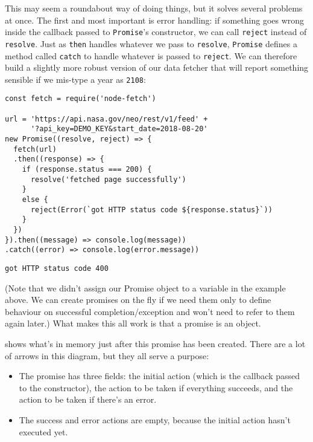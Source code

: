 This may seem a roundabout way of doing things,
but it solves several problems at once.
The first and most important is error handling:
if something goes wrong inside the callback passed to \texttt{Promise}'s constructor,
we can call \texttt{reject} instead of \texttt{resolve}.
Just as \texttt{then} handles whatever we pass to \texttt{resolve},
\texttt{Promise} defines a method called \texttt{catch} to handle whatever is passed to \texttt{reject}.
We can therefore build a slightly more robust version of our data fetcher
that will report something sensible if we mis-type a year as \texttt{2108}:

\begin{verbatim}
const fetch = require('node-fetch')

url = 'https://api.nasa.gov/neo/rest/v1/feed' +
      '?api_key=DEMO_KEY&start_date=2018-08-20'
new Promise((resolve, reject) => {
  fetch(url)
  .then((response) => {
    if (response.status === 200) {
      resolve('fetched page successfully')
    }
    else {
      reject(Error(`got HTTP status code ${response.status}`))
    }
  })
}).then((message) => console.log(message))
.catch((error) => console.log(error.message))
\end{verbatim}

\begin{verbatim}
got HTTP status code 400
\end{verbatim}

(Note that we didn't assign our Promise object to a variable in the example above.
We can create promises on the fly if we need them only to define behaviour on
successful completion/exception and won't need to refer to them again later.)
What makes this all work is that a promise is an object.


 shows what's in memory just after this promise has been created.
There are a lot of arrows in this diagram,
but they all serve a purpose:

\begin{itemize}
\item
  The promise has three fields:
  the initial action (which is the callback passed to the constructor),
  the action to be taken if everything succeeds,
  and the action to be taken if there's an error.
\item
  The success and error actions are empty,
  because the initial action hasn't executed yet.
\end{itemize}

